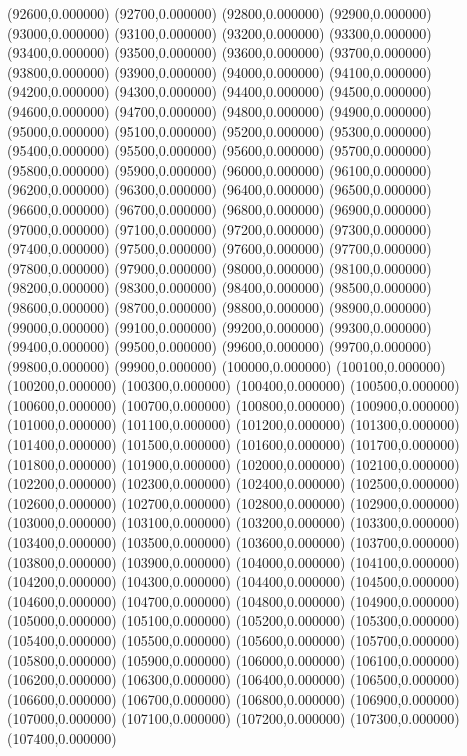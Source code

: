 (92600,0.000000)
(92700,0.000000)
(92800,0.000000)
(92900,0.000000)
(93000,0.000000)
(93100,0.000000)
(93200,0.000000)
(93300,0.000000)
(93400,0.000000)
(93500,0.000000)
(93600,0.000000)
(93700,0.000000)
(93800,0.000000)
(93900,0.000000)
(94000,0.000000)
(94100,0.000000)
(94200,0.000000)
(94300,0.000000)
(94400,0.000000)
(94500,0.000000)
(94600,0.000000)
(94700,0.000000)
(94800,0.000000)
(94900,0.000000)
(95000,0.000000)
(95100,0.000000)
(95200,0.000000)
(95300,0.000000)
(95400,0.000000)
(95500,0.000000)
(95600,0.000000)
(95700,0.000000)
(95800,0.000000)
(95900,0.000000)
(96000,0.000000)
(96100,0.000000)
(96200,0.000000)
(96300,0.000000)
(96400,0.000000)
(96500,0.000000)
(96600,0.000000)
(96700,0.000000)
(96800,0.000000)
(96900,0.000000)
(97000,0.000000)
(97100,0.000000)
(97200,0.000000)
(97300,0.000000)
(97400,0.000000)
(97500,0.000000)
(97600,0.000000)
(97700,0.000000)
(97800,0.000000)
(97900,0.000000)
(98000,0.000000)
(98100,0.000000)
(98200,0.000000)
(98300,0.000000)
(98400,0.000000)
(98500,0.000000)
(98600,0.000000)
(98700,0.000000)
(98800,0.000000)
(98900,0.000000)
(99000,0.000000)
(99100,0.000000)
(99200,0.000000)
(99300,0.000000)
(99400,0.000000)
(99500,0.000000)
(99600,0.000000)
(99700,0.000000)
(99800,0.000000)
(99900,0.000000)
(100000,0.000000)
(100100,0.000000)
(100200,0.000000)
(100300,0.000000)
(100400,0.000000)
(100500,0.000000)
(100600,0.000000)
(100700,0.000000)
(100800,0.000000)
(100900,0.000000)
(101000,0.000000)
(101100,0.000000)
(101200,0.000000)
(101300,0.000000)
(101400,0.000000)
(101500,0.000000)
(101600,0.000000)
(101700,0.000000)
(101800,0.000000)
(101900,0.000000)
(102000,0.000000)
(102100,0.000000)
(102200,0.000000)
(102300,0.000000)
(102400,0.000000)
(102500,0.000000)
(102600,0.000000)
(102700,0.000000)
(102800,0.000000)
(102900,0.000000)
(103000,0.000000)
(103100,0.000000)
(103200,0.000000)
(103300,0.000000)
(103400,0.000000)
(103500,0.000000)
(103600,0.000000)
(103700,0.000000)
(103800,0.000000)
(103900,0.000000)
(104000,0.000000)
(104100,0.000000)
(104200,0.000000)
(104300,0.000000)
(104400,0.000000)
(104500,0.000000)
(104600,0.000000)
(104700,0.000000)
(104800,0.000000)
(104900,0.000000)
(105000,0.000000)
(105100,0.000000)
(105200,0.000000)
(105300,0.000000)
(105400,0.000000)
(105500,0.000000)
(105600,0.000000)
(105700,0.000000)
(105800,0.000000)
(105900,0.000000)
(106000,0.000000)
(106100,0.000000)
(106200,0.000000)
(106300,0.000000)
(106400,0.000000)
(106500,0.000000)
(106600,0.000000)
(106700,0.000000)
(106800,0.000000)
(106900,0.000000)
(107000,0.000000)
(107100,0.000000)
(107200,0.000000)
(107300,0.000000)
(107400,0.000000)

